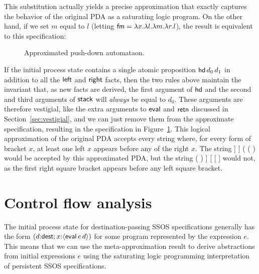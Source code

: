 \smallskip
{}
\smallskip

\noindent This substitution actually yields a precise approximation
that exactly captures the behavior of the original PDA as a saturating
logic program. On the other hand, if we set $m$ equal to $l$ 
(letting ${\sf fm} = \lambda x. \lambda l. \lambda m. \lambda r. l$), 
the result is equivalent to this specification:

\smallskip
{}
\smallskip

\begin{figure}
\caption{Approximated push-down automataon.}
\label{fig:pda-pers-approx2}
\end{figure}

If the initial process state contains a single atomic proposition
${\sf hd}\,d_0\,d_1$ in addition to all the ${\sf left}$ and ${\sf
  right}$ facts, then the two rules above maintain the invariant that,
as new facts are derived, the first argument of ${\sf hd}$ and the
second and third arguments of ${\sf stack}$ will {\it always} be equal
to $d_0$. These arguments are therefore vestigial, like the extra
arguments to ${\sf eval}$ and ${\sf retn}$ discussed in
Section~\ref{sec:vestigial}, and we can just remove them from the
approximate specification, resulting in the specification in
Figure~\ref{fig:pda-pers-approx2}. This logical approximation of the
original PDA accepts every string where, for every form of bracket
$x$, at least one left $x$ appears before any of the right $x$. The
string {\sf [ ] ] ] ( ( )} would be accepted by this approximated PDA,
but the string {\sf ( ) ] [ [ ]} would not, as the first right square
bracket appears before any left square bracket.


\section{Control flow analysis}
\label{sec:0cfa}

The initial process state for destination-passing SSOS specifications
generally has the form $(d{:}{\sf dest}; x{:}\langle {{\sf eval}\,e\,d} \rangle)$
for some program represented by the expression $e$. This means that we
can use the meta-approximation result to derive abstractions from
initial expressions $e$ using the saturating logic programming
interpretation of persistent SSOS specifications.

